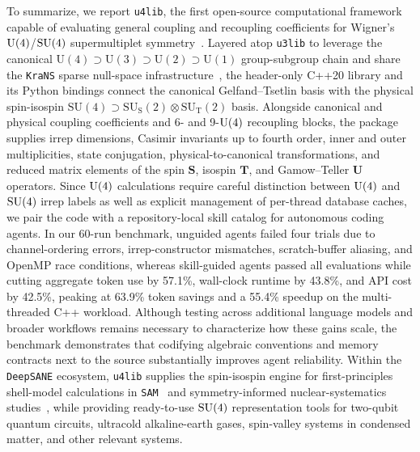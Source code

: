 \documentclass[aps,onecolumn,10pt,superscriptaddress,floatfix,nofootinbib]{revtex4}
\begin{document}
To summarize, we report \texttt{u4lib}, the first open-source computational framework capable of evaluating general coupling and recoupling coefficients for Wigner's $\rm U(4)$/$\rm SU(4)$ supermultiplet symmetry~\cite{Dang2024EPJP2}. Layered atop \texttt{u3lib} to leverage the canonical $\mathrm{U(4)}\supset\mathrm{U(3)}\supset\mathrm{U(2)}\supset\mathrm{U(1)}$ group-subgroup chain and share the \texttt{KraNS} sparse null-space infrastructure~\cite{Krastenov2026MSc}, the header-only C++20 library and its Python bindings connect the canonical Gelfand--Tsetlin basis with the physical spin-isospin $\mathrm{SU(4)}\supset\mathrm{SU_S(2)}\otimes\mathrm{SU_T(2)}$ basis. Alongside canonical and physical coupling coefficients and 6- and 9-$\rm U(4)$ recoupling blocks, the package supplies irrep dimensions, Casimir invariants up to fourth order, inner and outer multiplicities, state conjugation, physical-to-canonical transformations, and reduced matrix elements of the spin $\mathbf{S}$, isospin $\mathbf{T}$, and Gamow--Teller $\mathbf{U}$ operators. Since $\rm U(4)$ calculations require careful distinction between $\rm U(4)$ and $\rm SU(4)$ irrep labels as well as explicit management of per-thread database caches, we pair the code with a repository-local skill catalog for autonomous coding agents. In our 60-run benchmark, unguided agents failed four trials due to channel-ordering errors, irrep-constructor mismatches, scratch-buffer aliasing, and OpenMP race conditions, whereas skill-guided agents passed all evaluations while cutting aggregate token use by 57.1\%, wall-clock runtime by 43.8\%, and API cost by 42.5\%, peaking at 63.9\% token savings and a 55.4\% speedup on the multi-threaded C++ workload. Although testing across additional language models and broader workflows remains necessary to characterize how these gains scale, the benchmark demonstrates that codifying algebraic conventions and memory contracts next to the source substantially improves agent reliability. Within the \texttt{DeepSANE} ecosystem, \texttt{u4lib} supplies the spin-isospin engine for first-principles shell-model calculations in \texttt{SAM}~\cite{Dang2026_1} and symmetry-informed nuclear-systematics studies~\cite{Dang2026_2}, while providing ready-to-use $\rm SU(4)$ representation tools for two-qubit quantum circuits, ultracold alkaline-earth gases,  spin-valley systems in condensed matter, and other relevant systems.
\end{document}
